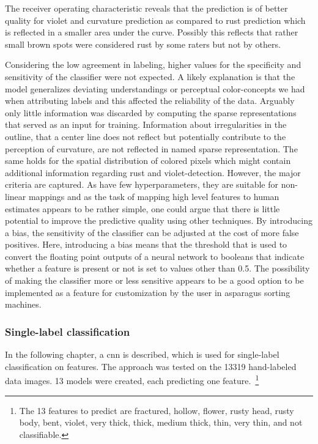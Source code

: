 The receiver operating characteristic reveals that the prediction is of better quality for violet and curvature prediction as compared to rust prediction which is reflected in a smaller area under the curve. Possibly this reflects that rather small brown spots were considered rust by some raters but not by others. 

Considering the low agreement in labeling, higher values for the specificity and sensitivity of the classifier were not expected. A likely explanation is that the model generalizes deviating understandings or perceptual color-concepts we had when attributing labels and this affected the reliability of the data. Arguably only little information was discarded by computing the sparse representations that served as an input for training. Information about irregularities in the outline, that a center line does not reflect but potentially contribute to the perception of curvature, are not reflected in named sparse representation. The same holds for the spatial distribution of colored pixels which might contain additional information regarding rust and violet-detection. However, the major criteria are captured. As  have few hyperparameters, they are suitable for non-linear mappings and as the task of mapping high level features to human estimates appears to be rather simple, one could argue that there is little potential to improve the predictive quality using other techniques. By introducing a bias, the sensitivity of the classifier can be adjusted at the cost of more false positives. Here, introducing a bias means that the threshold that is used to convert the floating point outputs of a neural network to booleans that indicate whether a feature is present or not is set to values other than 0.5. The possibility of making the classifier more or less sensitive appears to be a good option to be implemented as a feature for customization by the user in asparagus sorting machines.


\subsubsection{Single-label classification}
\label{subsec:SingleLabel}

In the following chapter, a \acrlong{cnn} is described, which is used for single-label classification on features. The approach was tested on the 13319 hand-labeled data images. 13 models were created, each predicting one feature.~\footnote{The 13 features to predict are fractured, hollow, flower, rusty head, rusty body, bent, violet, very thick, thick, medium thick, thin, very thin, and not classifiable.}
 
